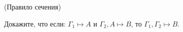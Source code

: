 
(Правило сечения)

Докажите, что если: $\Gamma_1 \mapsto A$ и $\Gamma_2, A \mapsto B$, то $\Gamma_1,
\Gamma_2 \mapsto B$.